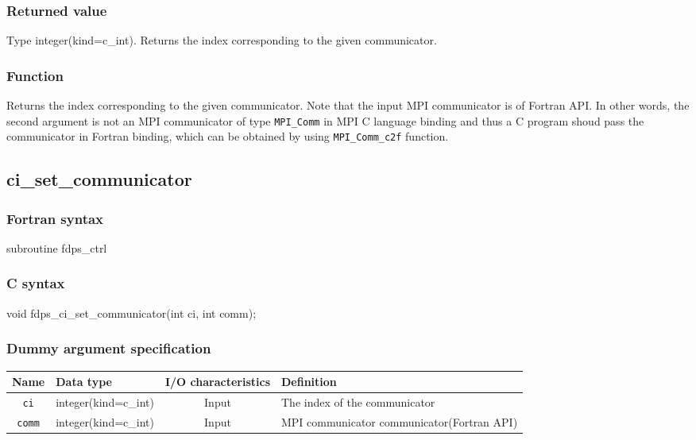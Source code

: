 \subsubsection*{Returned value}
Type integer(kind=c\_int). Returns the index corresponding to the
given communicator.

\subsubsection*{Function}
Returns the index corresponding to the
given communicator.
Note that the input MPI communicator is of Fortran API.
In other words, the second argument is not an MPI communicator of
type {\tt MPI\_Comm} in MPI C language binding and thus
a C program shoud pass the communicator in Fortran binding, which
can be obtained by using {\tt MPI\_Comm\_c2f} function.


\subsection{ci\_set\_communicator}
\subsubsection*{Fortran syntax}
\begin{screen}
\begin{spverbatim}
subroutine fdps_ctrl%
\end{spverbatim}
\end{screen}

\subsubsection*{C syntax}
\begin{screen}
\begin{spverbatim}
void fdps_ci_set_communicator(int ci, int comm);
\end{spverbatim}
\end{screen}

\subsubsection*{Dummy argument specification}
\begin{table}[h]
\begin{tabularx}{\linewidth}{cXcX}
\toprule
\rowcolor{Snow2}
Name & Data type & I/O characteristics & Definition \\
\midrule
\verb|ci| & integer(kind=c\_int) & Input & The index of the communicator\\
\verb|comm| & integer(kind=c\_int) & Input & MPI communicator communicator(Fortran API)\\
\bottomrule
\end{tabularx}
\end{table}



